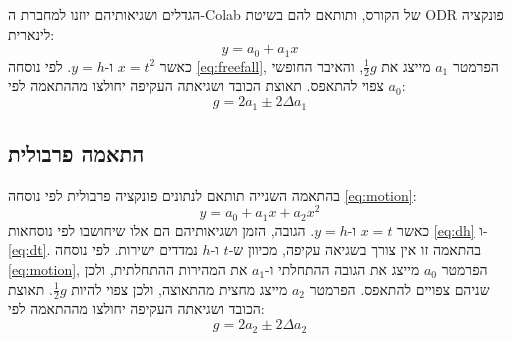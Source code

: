 \documentclass[10pt,a4paper]{article}
\newcommand{\textenglish}[1]{\foreignlanguage{english}{#1}}
\newcommand{\added}[1]{\textcolor{addedblue}{#1}}
\begin{document}
הגדלים ושגיאותיהם יוזנו למחברת ה-\textenglish{Colab} של הקורס, ותותאם להם \added{בשיטת \textenglish{ODR}} פונקציה לינארית:
\begin{equation}\label{eq:linfit}
y = a_0 + a_1 x
\end{equation}
כאשר $x = t^2$ ו-$y = h$.
לפי נוסחה \eqref{eq:freefall}, הפרמטר $a_1$ מייצג את $\frac{1}{2}g$, והאיבר החופשי $a_0$ צפוי להתאפס. תאוצת הכובד ושגיאתה העקיפה יחולצו מההתאמה לפי:
\begin{equation}\label{eq:glin}
g = 2a_1 \pm 2\Delta a_1
\end{equation}

\subsection*{התאמה פרבולית}
בהתאמה השנייה תותאם לנתונים פונקציה פרבולית לפי נוסחה \eqref{eq:motion}:
\begin{equation}\label{eq:parfit}
y = a_0 + a_1 x + a_2 x^2
\end{equation}
כאשר $x = t$ ו-$y = h$.
הגובה, הזמן ושגיאותיהם הם אלו שיחושבו לפי נוסחאות \eqref{eq:dh} ו-\eqref{eq:dt}. בהתאמה זו אין צורך בשגיאה עקיפה, מכיוון ש-$t$ ו-$h$ נמדדים ישירות.
לפי נוסחה \eqref{eq:motion}, הפרמטר $a_0$ מייצג את הגובה ההתחלתי ו-$a_1$ את המהירות ההתחלתית, ולכן שניהם צפויים להתאפס. הפרמטר $a_2$ מייצג מחצית מהתאוצה, ולכן צפוי להיות $\frac{1}{2}g$.
\added{תאוצת הכובד ושגיאתה העקיפה יחולצו מההתאמה לפי:}
{\color{addedblue}
\begin{equation}\label{eq:gpar}
g = 2a_2 \pm 2\Delta a_2
\end{equation}}
\end{document}
